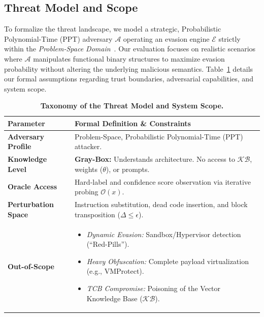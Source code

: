 \documentclass[pdflatex,sn-mathphys-num]{sn-jnl}
\begin{document}
\subsection{Threat Model and Scope}
\label{sec:threat_model_scope}

To formalize the threat landscape, we model a strategic, Probabilistic Polynomial-Time (PPT) adversary $\mathcal{A}$ operating an evasion engine $\mathcal{E}$ strictly within the \textit{Problem-Space Domain}~\cite{PierazziFabio2020Intriguing}. Our evaluation focuses on realistic scenarios where $\mathcal{A}$ manipulates functional binary structures to maximize evasion probability without altering the underlying malicious semantics. Table~\ref{tab:threat_model} details our formal assumptions regarding trust boundaries, adversarial capabilities, and system scope.

\begin{table}[h]
\centering
\caption{\textbf{Taxonomy of the Threat Model and System Scope.}}
\label{tab:threat_model}
\begin{tabular}{l|p{}}
\toprule
\textbf{Parameter} & \textbf{Formal Definition \& Constraints} \\
\midrule
\textbf{Adversary Profile} & Problem-Space, Probabilistic Polynomial-Time (PPT) attacker. \\
\midrule
\textbf{Knowledge Level} & \textbf{Gray-Box:} Understands architecture. No access to $\mathcal{KB}$, weights ($\theta$), or prompts. \\
\midrule
\textbf{Oracle Access} & Hard-label and confidence score observation via iterative probing $\mathcal{O}(x)$. \\
\midrule
\textbf{Perturbation Space} & Instruction substitution, dead code insertion, and block transposition ($\Delta \leq \epsilon$). \\
\midrule
\textbf{Out-of-Scope} & 
\vspace{-2mm}
\begin{itemize}[leftmargin=*, nosep]
    \item \textit{Dynamic Evasion:} Sandbox/Hypervisor detection (``Red-Pills'').
    \item \textit{Heavy Obfuscation:} Complete payload virtualization (e.g., VMProtect).
    \item \textit{TCB Compromise:} Poisoning of the Vector Knowledge Base ($\mathcal{KB}$).
\end{itemize} \\
\bottomrule
\end{tabular}%
\end{table}
\end{document}
